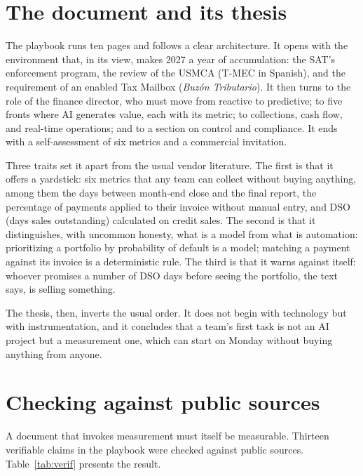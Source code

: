 \documentclass[11pt,a4paper]{article}
\begin{document}
\section{The document and its thesis}

The playbook runs ten pages and follows a clear architecture. It opens with the environment that, in its view, makes 2027 a year of accumulation: the SAT's enforcement program, the review of the USMCA (T-MEC in Spanish), and the requirement of an enabled Tax Mailbox (\emph{Buz\'on Tributario}). It then turns to the role of the finance director, who must move from reactive to predictive; to five fronts where AI generates value, each with its metric; to collections, cash flow, and real-time operations; and to a section on control and compliance. It ends with a self-assessment of six metrics and a commercial invitation.

Three traits set it apart from the usual vendor literature. The first is that it offers a yardstick: six metrics that any team can collect without buying anything, among them the days between month-end close and the final report, the percentage of payments applied to their invoice without manual entry, and DSO (days sales outstanding) calculated on credit sales. The second is that it distinguishes, with uncommon honesty, what is a model from what is automation: prioritizing a portfolio by probability of default is a model; matching a payment against its invoice is a deterministic rule. The third is that it warns against itself: whoever promises a number of DSO days before seeing the portfolio, the text says, is selling something.

The thesis, then, inverts the usual order. It does not begin with technology but with instrumentation, and it concludes that a team's first task is not an AI project but a measurement one, which can start on Monday without buying anything from anyone.

\section{Checking against public sources}
\label{sec:check}

A document that invokes measurement must itself be measurable. Thirteen verifiable claims in the playbook were checked against public sources. Table~\ref{tab:verif} presents the result.
\end{document}
